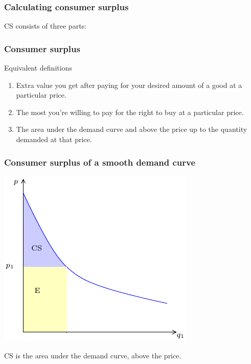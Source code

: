 \documentclass[xcolor=pdftex,dvipsnames]{beamer}
\begin{document}
\begin{frame}
\frametitle{Calculating consumer surplus}
CS  consists of three parts:
\bigskip

\bigskip


\bigskip
{}


\end{frame}




\begin{frame}
\frametitle{Consumer surplus}
Equivalent definitions
\begin{enumerate}[<+->]
\item Extra value you get after paying for your desired
amount of a good at a particular price.
\item The most you're willing to pay for the right to buy at a
  particular price.
\item The area under the demand curve and above the price up to the
  quantity demanded at that price.
\end{enumerate}
\end{frame}




\begin{frame}
\frametitle{Consumer surplus of a smooth demand curve}
\begin{center}\includegraphics{pics/SmoothConsSurp}\end{center}
CS is the area under the demand curve, above the price.

\bigskip
{}
\end{frame}
\end{document}
